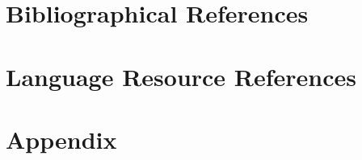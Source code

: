 \documentclass[10pt, a4paper]{article}
\begin{document}
\newpage
\nocite{*}
\section{Bibliographical References}\label{sec:reference}




\section{Language Resource References}
\label{lr:ref}


\newpage
\appendix
\onecolumn

\section{Appendix}
\end{document}
